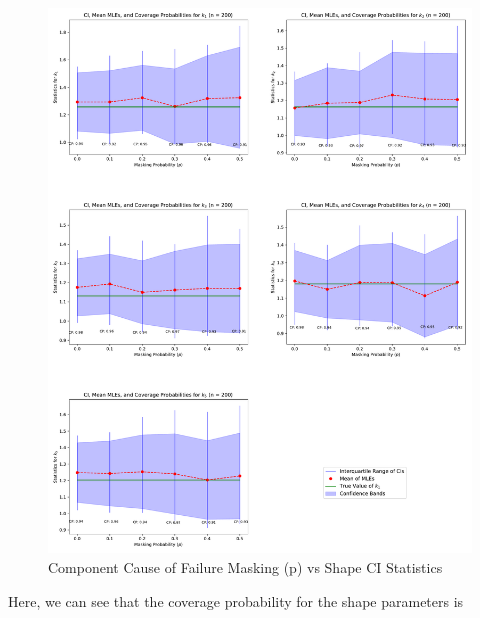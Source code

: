 \documentclass[
]{article}
\begin{document}
\begin{figure}

{\centering \includegraphics{image/plot-p-vs-stats-shape} 

}

\caption{Component Cause of Failure Masking (p) vs Shape CI Statistics}\label{fig:masking-prob-vs-stats-shape}
\end{figure}

Here, we can see that the coverage probability for the shape parameters
is
\end{document}
